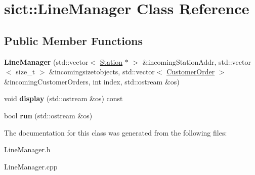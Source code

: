 \hypertarget{classsict_1_1LineManager}{}\section{sict\+::Line\+Manager Class Reference}
\label{classsict_1_1LineManager}
\subsection*{Public Member Functions}
\begin{DoxyCompactItemize}
\item 
\mbox{\label{classsict_1_1LineManager_a63839df687765c8c083a9e38265b71ab}} 
{\bfseries Line\+Manager} (std\+::vector$<$ \mbox{\hyperlink{classsict_1_1Station}{Station}} $\ast$ $>$ \&incoming\+Station\+Addr, std\+::vector$<$ size\+\_\+t $>$ \&incomingsizetobjects, std\+::vector$<$ \mbox{\hyperlink{classsict_1_1CustomerOrder}{Customer\+Order}} $>$ \&incoming\+Customer\+Orders, int index, std\+::ostream \&os)
\item 
\mbox{\label{classsict_1_1LineManager_ad4d40fef3cc77b5890654f95cf90b595}} 
void {\bfseries display} (std\+::ostream \&os) const
\item 
\mbox{\label{classsict_1_1LineManager_ae50b0c9cc0130ddcf0435ff9b9b2a919}} 
bool {\bfseries run} (std\+::ostream \&os)
\end{DoxyCompactItemize}


The documentation for this class was generated from the following files\+:\begin{DoxyCompactItemize}
\item 
Line\+Manager.\+h\item 
Line\+Manager.\+cpp\end{DoxyCompactItemize}
